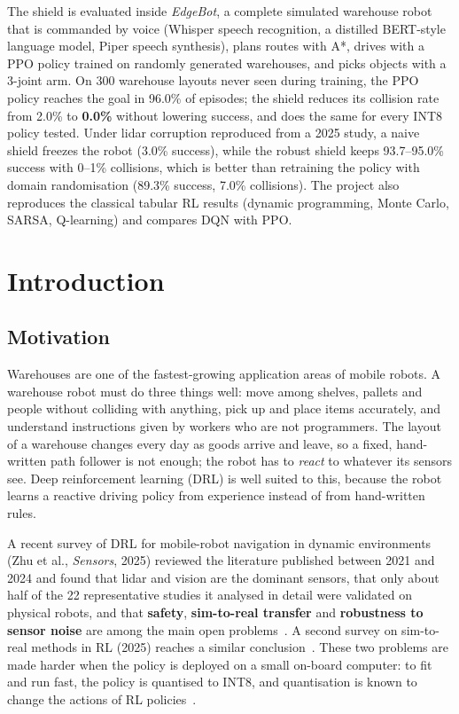 \documentclass[12pt,a4paper,oneside]{report}
\begin{document}
The shield is evaluated inside \emph{EdgeBot}, a complete simulated warehouse robot that is commanded by voice
(Whisper speech recognition, a distilled BERT-style language model, Piper speech synthesis), plans routes with A*,
drives with a PPO policy trained on randomly generated warehouses, and picks objects with a 3-joint arm. On 300
warehouse layouts never seen during training, the PPO policy reaches the goal in 96.0\% of episodes; the shield
reduces its collision rate from 2.0\% to \textbf{0.0\%} without lowering success, and does the same for every INT8
policy tested. Under lidar corruption reproduced from a 2025 study, a naive shield freezes the robot (3.0\% success),
while the robust shield keeps 93.7--95.0\% success with 0--1\% collisions, which is better than retraining the policy
with domain randomisation (89.3\% success, 7.0\% collisions). The project also reproduces the classical tabular RL
results (dynamic programming, Monte Carlo, SARSA, Q-learning) and compares DQN with PPO.

\tableofcontents
\listoffigures
\listoftables
\clearpage
{}

\chapter{Introduction}
\label{ch:intro}

\section{Motivation}
Warehouses are one of the fastest-growing application areas of mobile robots. A warehouse robot must do three
things well: move among shelves, pallets and people without colliding with anything, pick up and place items
accurately, and understand instructions given by workers who are not programmers. The layout of a warehouse
changes every day as goods arrive and leave, so a fixed, hand-written path follower is not enough; the robot has to
\emph{react} to whatever its sensors see. Deep reinforcement learning (DRL) is well suited to this, because the
robot learns a reactive driving policy from experience instead of from hand-written rules.

A recent survey of DRL for mobile-robot navigation in dynamic environments (Zhu et al., \emph{Sensors}, 2025)
reviewed the literature published between 2021 and 2024 and found that lidar and vision are the dominant sensors,
that only about half of the 22 representative studies it analysed in detail were validated on physical robots, and
that \textbf{safety}, \textbf{sim-to-real transfer} and \textbf{robustness to sensor noise} are among the main open
problems~\cite{zhu2025survey}. A second survey on sim-to-real methods in RL (2025) reaches a similar
conclusion~\cite{sim2realsurvey2025}. These two problems are made harder when the policy is deployed on a small
on-board computer: to fit and run fast, the policy is quantised to INT8, and quantisation is known to change the
actions of RL policies~\cite{quarl,quantprune2024,quantctrl2025}.
\end{document}
